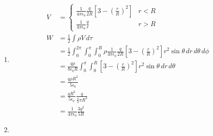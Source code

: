 \documentclass{article}
\newcommand{\ke}{\frac{1}{4 \pi \epsilon_0}}
\begin{document}
\subsection{}

\begin{enumerate}
  \item

        \begin{align*}
          V & = \begin{cases}
                  \ke \frac{q}{2 R} \left[ 3 - \left( \frac{r}{R} \right)^2 \right] & r < R \\
                  \ke \frac{q}{r}                                                   & r > R
                \end{cases}                                                                                       \\
          W & = \frac{1}{2} \int \rho V \,d \tau                                                                                                                                \\
            & = \frac{1}{2} \int_0^{2 \pi} \int_0^\pi \int_0^R \rho \ke \frac{q}{2 R} \left[ 3 - \left( \frac{r}{R} \right)^2 \right] r^2 \sin \theta \,d r \,d \theta \,d \phi \\
            & = \frac{q \rho}{8 \epsilon_0 R} \int_0^\pi \int_0^R \left[ 3 - \left( \frac{r}{R} \right)^2 \right] r^2 \sin \theta \,d r \,d \theta                              \\
            & = \frac{q \rho R^2}{5 \epsilon_0}                                                                                                                                 \\
            & = \frac{q R^2}{5 \epsilon_0} \frac{q}{\frac{4}{3} \pi R^3}                                                                                                        \\
            & = \ke \frac{3 q^2}{5 R}
        \end{align*}

  \item


\end{enumerate}
\end{document}
